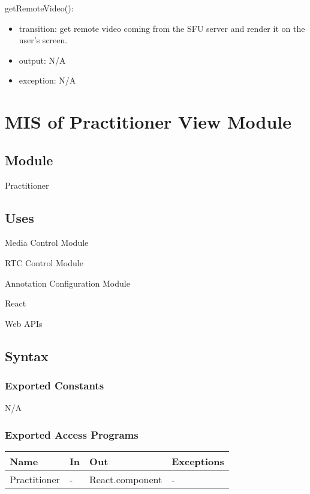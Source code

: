 \documentclass[12pt, titlepage]{article}
\begin{document}
\noindent getRemoteVideo():
\begin{itemize}
\item transition: get remote video coming from the SFU server and render it on the
  user's screen.
\item output: N/A
\item exception: N/A
\end{itemize}


\section{MIS of Practitioner View Module} \label{sec:pracview}

\subsection{Module}

Practitioner

\subsection{Uses}

\noindent Media Control Module

\noindent RTC Control Module

\noindent Annotation Configuration Module

\noindent React

\noindent Web APIs

\subsection{Syntax}

\subsubsection{Exported Constants}

N/A

\subsubsection{Exported Access Programs}

\begin{center}
  \begin{tabular}{p{4cm} p{4cm} p{4cm} p{2cm}}
    \hline
    \textbf{Name}      & \textbf{In} & \textbf{Out}          & \textbf{Exceptions} \\
    \hline
    Practitioner & -     & React.component & -             \\
    \hline
  \end{tabular}
\end{center}
\end{document}
